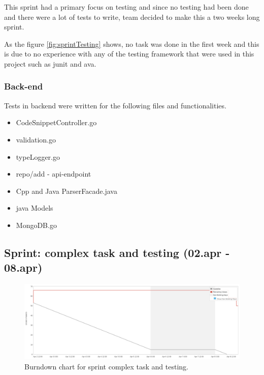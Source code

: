 This \gls{sprint} had a primary focus on testing and since no testing had been done and there were a lot of tests to write, team decided to make this a two weeks long \gls{sprint}. 

As the figure \ref{fig:sprintTesting} shows, no task was done in the first week and this is due to no experience with any of the testing framework that were used in this project such as \gls{junit} and \gls{ava}. 

\subsubsection{Back-end}
Tests in \gls{backend} were written for the following files and functionalities.
\begin{itemize}
    \item CodeSnippetController.go
    \item validation.go
    \item typeLogger.go
    \item repo/add - \gls{api}-endpoint
    \item Cpp and Java ParserFacade.java
    \item java Models
    \item MongoDB.go
\end{itemize}

\subsection{Sprint: complex task and testing (02.apr - 08.apr)}
\begin{figure}[H] 
    \includegraphics[width=\textwidth]{inc/images/sprints/sprintComplexTaskAndTest020419-080419.png}
    \caption{Burndown chart for sprint complex task and testing.}
    \label{fig:sprintComplexTaskAndTesting}
\end{figure}

